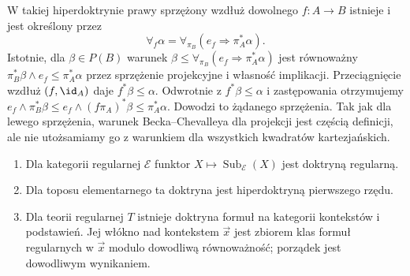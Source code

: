 W takiej hiperdoktrynie prawy sprzężony wzdłuż dowolnego $f:A\to B$ istnieje i jest określony przez
\[
 \forall_f\alpha=\forall_{\pi_B}(e_f\Rightarrow\pi_A^*\alpha).
\]
Istotnie, dla $\beta\in P(B)$ warunek $\beta\leq\forall_{\pi_B}(e_f\Rightarrow\pi_A^*\alpha)$ jest równoważny $\pi_B^*\beta\wedge e_f\leq\pi_A^*\alpha$ przez sprzężenie projekcyjne i własność implikacji. Przeciągnięcie wzdłuż $(f,\id_A)$ daje $f^*\beta\leq\alpha$. Odwrotnie z $f^*\beta\leq\alpha$ i zastępowania otrzymujemy $e_f\wedge\pi_B^*\beta\leq e_f\wedge(f\pi_A)^*\beta\leq\pi_A^*\alpha$. Dowodzi to żądanego sprzężenia. Tak jak dla lewego sprzężenia, warunek Becka--Chevalleya dla projekcji jest częścią definicji, ale nie utożsamiamy go z warunkiem dla wszystkich kwadratów kartezjańskich.

\begin{stwierdzenie}\label{cat:prop:cl-doctrine-examples}
\begin{enumerate}
 \item Dla kategorii regularnej $\mathcal E$ funktor $X\mapsto\operatorname{Sub}_{\mathcal E}(X)$ jest doktryną regularną.
 \item Dla toposu elementarnego ta doktryna jest hiperdoktryną pierwszego rzędu.
 \item Dla teorii regularnej $T$ istnieje doktryna formuł na kategorii kontekstów i podstawień. Jej włókno nad kontekstem $\vec x$ jest zbiorem klas formuł regularnych w $\vec x$ modulo dowodliwą równoważność; porządek jest dowodliwym wynikaniem.
\end{enumerate}
\end{stwierdzenie}
